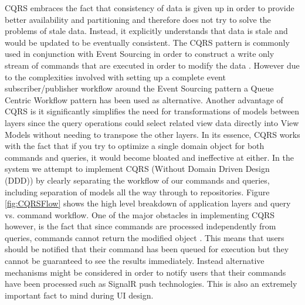 CQRS embraces the fact that consistency of data is given up in order to provide better availability  and partitioning and therefore does not try to solve the problems of stale data. Instead, it explicitly understands that data is stale and would be updated to be eventually consistent. The CQRS pattern is commonly used in conjunction with Event Sourcing in order to construct a write only stream of commands that are executed in order to modify the data \cite{Homer2014}. However due to the complexities involved with setting up a complete event subscriber/publisher workflow around the Event Sourcing pattern a Queue Centric Workflow pattern has been used as alternative. Another advantage of CQRS is it significantly simplifies the need for transformations of models between layers since the query operations could select related view data directly into View Models without needing to transpose the other layers. In its essence, CQRS works with the fact that if you try to optimize a single domain object for both commands and queries, it would become bloated and ineffective at either. In the system we attempt to implement CQRS (Without Domain Driven Design (DDD)) by clearly separating the workflow of our commands and queries, including separation of models all the way through to repositories. Figure \ref{fig:CQRSFlow} shows the high level breakdown of application layers and query vs. command workflow. One of the major obstacles in implementing CQRS however, is the fact that since commands are processed independently from queries, commands cannot return the modified object \cite{Homer2014}. This means that users should be notified that their command has been queued for execution but they cannot be guaranteed to see the results immediately. Instead alternative mechanisms might be considered in order to notify users that their commands have been processed such as SignalR push technologies. This is also an extremely important fact to mind during UI design.
 
 
